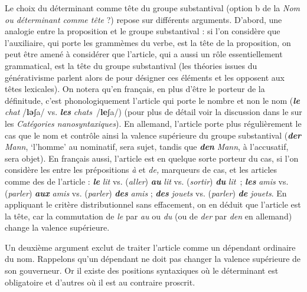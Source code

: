 Le choix du déterminant comme tête du groupe substantival (option b de la  \textit{Nom ou déterminant comme tête} ?) repose sur différents arguments. D’abord, une analogie entre la proposition et le groupe substantival : si l’on considère que l’auxiliaire, qui porte les grammèmes du verbe, est la tête de la proposition, on peut être amené à considérer que l’article, qui a aussi un rôle essentiellement grammatical, est la tête du groupe substantival (les théories issues du générativisme parlent alors de  pour désigner ces éléments et les opposent aux têtes lexicales). On notera qu’en français, en plus d’être le porteur de la définitude, c’est phonologiquement l’article qui porte le nombre et non le nom (\textbf{\textit{le}} \textit{chat} /\textbf{lǝ}ʃa/ vs. \textbf{\textit{les}} \textit{chats}~/\textbf{le}ʃa/) (pour plus de détail voir la discussion dans le  sur les \textit{Catégories nanosyntaxiques}). En allemand, l’article porte plus régulièrement le cas que le nom et contrôle ainsi la valence supérieure du groupe substantival (\textbf{\textit{der}} \textit{Mann}, ‘l’homme’ au nominatif, sera sujet, tandis que \textbf{\textit{den}} \textit{Mann}, à l’accusatif, sera objet). En français aussi, l’article est en quelque sorte porteur du cas, si l’on considère les  entre les prépositions \textit{à} et \textit{de,} marqueurs de cas, et les articles comme des  de l’article : \textbf{\textit{le}} \textit{lit} vs. (\textit{aller}) \textbf{\textit{au}} \textit{lit} vs. (\textit{sortir}) \textbf{\textit{du}} \textit{lit~}; \textbf{\textit{les}} \textit{amis} vs. (\textit{parler}) \textbf{\textit{aux}} \textit{amis} vs. (\textit{parler}) \textbf{\textit{des}} \textit{amis} ; \textbf{\textit{des}} \textit{jouets} vs. (\textit{parler}) \textbf{\textit{de}} \textit{jouets}. En appliquant le critère distributionnel sans effacement, on en déduit que l’article est la tête, car la commutation de \textit{le} par \textit{au} ou \textit{du} (ou de \textit{der} par \textit{den} en allemand) change la valence supérieure.

Un deuxième argument exclut de traiter l’article comme un dépendant ordinaire du nom. Rappelons qu’un dépendant ne doit pas changer la valence supérieure de son gouverneur. Or il existe des positions syntaxiques où le déterminant est obligatoire et d’autres où il est au contraire proscrit.

\ea
  \z
\z

